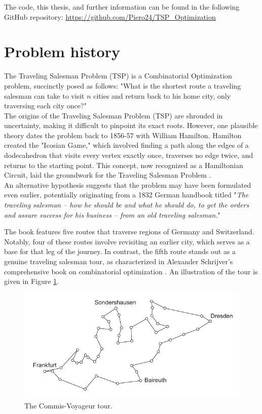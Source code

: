 \noindent The code, this thesis, and further information can be found in the following GitHub repository: \url{https://github.com/Piero24/TSP_Optimization}


\section{Problem history}
The Traveling Salesman Problem (TSP) is a Combinatorial Optimization problem, succinctly posed as follows: "What is the shortest route a traveling salesman can take to visit \( n \) cities and return back to his home city, only traversing each city once?" \\

\noindent The origins of the Traveling Salesman Problem (TSP) are shrouded in uncertainty, making it difficult to pinpoint its exact roots. However, one plausible theory dates the problem back to 1856-57 with William Hamilton. Hamilton created the "Icosian Game," which involved finding a path along the edges of a dodecahedron that visits every vertex exactly once, traverses no edge twice, and returns to the starting point. This concept, now recognized as a Hamiltonian Circuit, laid the groundwork for the Traveling Salesman Problem \cite{biron2006}. \\

\noindent An alternative hypothesis suggests that the problem may have been formulated even earlier, potentially originating from a 1832 German handbook titled "\textit{The traveling salesman – how he should be and what he should do, to get the orders and assure success for his business – from an old traveling salesman.}"

The book features five routes that traverse regions of Germany and Switzerland. Notably, four of these routes involve revisiting an earlier city, which serves as a base for that leg of the journey. In contrast, the fifth route stands out as a genuine traveling salesman tour, as characterized in Alexander Schrijver's comprehensive book on combinatorial optimization \cite{unknown:TSP}. An illustration of the tour is given in Figure \ref{fig:TSP_path}. 

\begin{figure}
    \centering
    \includegraphics[width=0.9\linewidth]{Immagini/TsP_path.pdf}
    \caption{The Commis-Voyageur tour.}
    \label{fig:TSP_path}
\end{figure}

